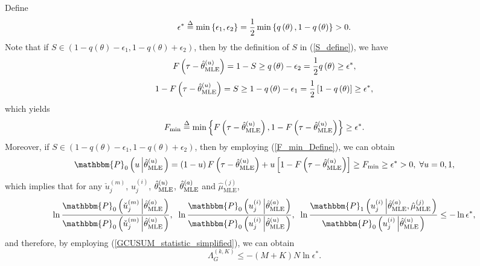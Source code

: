 \documentclass[11pt, draftclsnofoot, onecolumn]{IEEEtran}
\newcommand{\bbP}{\mathbbm{P}}
\newcommand{\cu}{{\check{u}}}
\begin{document}
\begin{IEEEproof}
Define
\begin{equation} \label{epsilon_star_define}
{\epsilon ^*} \buildrel \Delta \over = \min \left\{ {{\epsilon _1},{\epsilon _2}} \right\} = \frac{1}{2}\min \left\{ {q\left( \theta  \right),1 - q\left( \theta  \right)} \right\} >0.
\end{equation}
Note that if ${S \in \left( {1 - q\left( \theta  \right) - {\epsilon _1},1 - q\left( \theta  \right) + {\epsilon _2}} \right)}$, then by the definition of $S$ in (\ref{S_define}), we have
\begin{equation}
F\left( {\tau  - \hat \theta _{{\rm{MLE}}}^{(u)}} \right) = 1 - S \ge q\left( \theta  \right) - {\epsilon _2} = \frac{1}{2}q\left( \theta  \right) \ge {\epsilon ^*},
\end{equation}
\begin{equation}
1 - F\left( {\tau  - \hat \theta _{{\rm{MLE}}}^{(u)}} \right) = S \ge 1 - q\left( \theta  \right) - {\epsilon _1} = \frac{1}{2}\left[ {1 - q\left( \theta  \right)} \right] \ge {\epsilon ^*},
\end{equation}
which yields
\begin{equation} \label{F_min_Define}
{F_{\min }} \buildrel \Delta \over = \min \left\{ {F\left( {\tau  - \hat \theta _{{\rm{MLE}}}^{(u)}} \right),1 - F\left( {\tau  - \hat \theta _{{\rm{MLE}}}^{(u)}} \right)} \right\} \ge {\epsilon ^*}.
\end{equation}
Moreover, if  ${S \in \left( {1 - q\left( \theta  \right) - {\epsilon _1},1 - q\left( \theta  \right) + {\epsilon _2}} \right)}$, then by employing (\ref{F_min_Define}), we can obtain
\begin{equation}
{\bbP_0}\left( {u\left| {\hat \theta _{{\rm{MLE}}}^{(u)}} \right.} \right) = \left( {1 - u} \right)F\left( {\tau  - \hat \theta _{{\rm{MLE}}}^{(u)}} \right) + u\left[ {1 - F\left( {\tau  - \hat \theta _{{\rm{MLE}}}^{(u)}} \right)} \right] \ge {F_{\min }} \ge {\epsilon ^*} > 0, \; \forall u=0,1,
\end{equation}
which implies that for any $\cu_j^{(m)}$, $u_j^{(i)}$, ${\hat \theta _{{\rm{MLE}}}^{(u)}}$, ${\hat \theta _{{\rm{MLE}}}^{(a)}}$ and ${\hat \mu }_{\text{MLE}}^{(j)}$, 
\begin{equation}
\ln \frac{{{\bbP_0}\left( {\cu_j^{(m)}\left| {\hat \theta _{{\rm{MLE}}}^{(a)}} \right.} \right)}}{{{\bbP_0}\left( {\cu_j^{(m)}\left| {\hat \theta _{{\rm{MLE}}}^{(u)}} \right.} \right)}}, \;\; \ln \frac{{{\bbP_0}\left( {u_j^{(i)}\left| {\hat \theta _{{\rm{MLE}}}^{(a)}} \right.} \right)}}{{{\bbP_0}\left( {u_j^{(i)}\left| {\hat \theta _{{\rm{MLE}}}^{(u)}} \right.} \right)}}, \;\;\ln \frac{{{\bbP_1}\left( {u_j^{(i)}\left| {\hat \theta _{{\rm{MLE}}}^{(a)},{{\hat \mu }_{\text{MLE}}^{(j)}}} \right.} \right)}}{{{\bbP_0}\left( {u_j^{(i)}\left| {\hat \theta _{{\rm{MLE}}}^{(u)}} \right.} \right)}} \le  - \ln {\epsilon ^*},
\end{equation}
and therefore, by employing (\ref{GCUSUM_statistic_simplified}), we can obtain
\begin{equation} \label{Lambda_ub_1}
\Lambda _G^{(k,K)} \le  - \left( {M + K} \right)N\ln {\epsilon ^*}.
\end{equation}


\end{IEEEproof}
\end{document}
